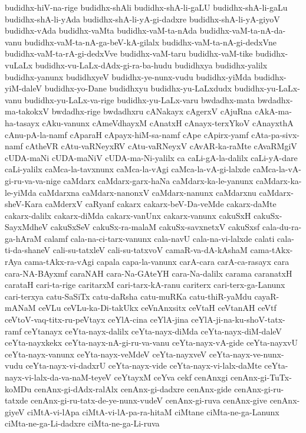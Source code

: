 {budidhx-hiV-na-rige
budidhx-shAli
budidhx-shA-li-gaLU
budidhx-shA-li-gaLu
budidhx-shA-li-yAda
budidhx-shA-li-yA-gi-dadxre
budidhx-shA-li-yA-giyoV
budidhx-vAda
budidhx-vaMta
budidhx-vaM-ta-nAda
budidhx-vaM-ta-nA-da-vanu
budidhx-vaM-ta-nA-ga-beV-kA-gilalx
budidhx-vaM-ta-nA-gi-dedxVne
budidhx-vaM-ta-rA-gi-dedxVve
budidhx-vaM-taru
budidhx-vaM-tike
budidhx-vuLaLx
budidhx-vu-LaLx-dAdx-gi-ra-ba-hudu
budidhxya
budidhx-yalilx
budidhx-yanunx
budidhxyeV
budidhx-ye-nunx-vudu
budidhx-yiMda
budidhx-yiM-daleV
budidhx-yo-Dane
budidhxyu
budidhx-yu-LaLxdudx
budidhx-yu-LaLx-vanu
budidhx-yu-LaLx-va-rige
budidhx-yu-LaLx-varu
bwdadhx-mata
bwdadhx-ma-takokxV
bwdadhx-rige
bwdadhxru
cANakayx
cAgerxV
cAjuRna
cAkA-ma-ha-tasayx
cAku-vanunx
cAmeVdhayxM
cAnatxH
cAnayx-terxYkoV
cAnayxthA
cAnu-pA-la-namf
cAparaH
cApayx-hiM-sa-namf
cApe
cApirx-yamf
cAta-pa-sivx-namf
cAtheVR
cAtu-vaRNeyxRV
cAtu-vaRNeyxV
cAvAR-ka-raMte
cAvaRMgiV
cUDA-maNi
cUDA-maNiV
cUDA-ma-Ni-yalilx
ca
caLi-gA-la-dalilx
caLi-yA-dare
caLi-yalilx
caMca-la-tavxnunx
caMca-la-vAgi
caMca-la-vA-gi-lalxde
caMca-la-vA-gi-ru-va-va-nige
caMdarx
caMdarx-garx-haNa
caMdarx-ka-le-yanunx
caMdarx-ka-le-yiMda
caMdarxna
caMdarx-nanonxV
caMdarx-nanunx
caMdarxnu
caMdarx-sheV-Kara
caMderxV
caRyanf
cakarx
cakarx-beV-Da-veMde
cakarx-daMte
cakarx-dalilx
cakarx-diMda
cakarx-vanUnx
cakarx-vanunx
cakuSxH
cakuSx-SayxMdheV
cakuSxSeV
cakuSx-ra-malaM
cakuSx-savxnetxV
cakuSxsf
cala-du-ra-ga-hAraM
calamf
cala-na-ci-tarx-vanunx
cala-navU
cala-na-vi-lalxde
calati
cala-ti-da-shaneV
cali-su-tatxleV
cali-su-tatxvoV
camaR-va-dA-kAshaM
cama-tAkx-rAya
cama-tAkx-ra-vAgi
capala
capa-la-vanunx
carA-cara
carA-ca-rasayx
cara
cara-NA-BAyxmf
caraNAH
cara-Na-GAteYH
cara-Na-dalilx
carama
caranatxH
carataH
cari-ta-rige
caritarxM
cari-tarx-kA-ranu
cariterx
cari-terx-ga-Lanunx
cari-terxya
catu-SaSiTx
catu-daRsha
catu-muRKa
catu-thiR-yaMdu
cayaR-mANaM
ceVLu
ceVLu-ka-Di-takUkx
ceVnAnxsitx
ceVtaH
ceVtanAH
ceVtf
ceVtoV-vaq-titx-ru-peVtayx
ceYlA-cina
ceYlA-jina
ceYlA-ji-na-ku-shoV-tatx-ramf
ceYtanayx
ceYta-nayx-dalilx
ceYta-nayx-diMda
ceYta-nayx-diM-daleV
ceYta-nayxkekx
ceYta-nayx-nA-gi-ru-va-vanu
ceYta-nayx-vA-gide
ceYta-nayxvU
ceYta-nayx-vanunx
ceYta-nayx-veMdeV
ceYta-nayxveV
ceYta-nayx-ve-nunx-vudu
ceYta-nayx-vi-dadxrU
ceYta-nayx-vide
ceYta-nayx-vi-lalx-daMte
ceYta-nayx-vi-lalx-da-va-naM-teyeV
ceYtayxM
ceYva
cekf
cenAnxgi
cenAnx-gi-TuTx-koMDu
cenAnx-gi-dAdx-ralAlx
cenAnx-gi-dadxre
cenAnx-gide
cenAnx-gi-ru-tatxde
cenAnx-gi-ru-tatx-de-ye-nunx-vudeV
cenAnx-gi-ruva
cenAnx-give
cenAnx-giyeV
ciMtA-vi-lApa
ciMtA-vi-lA-pa-ra-hitaM
ciMtane
ciMta-ne-ga-Lanunx
ciMta-ne-ga-Li-dadxre
ciMta-ne-ga-Li-ruva
}
